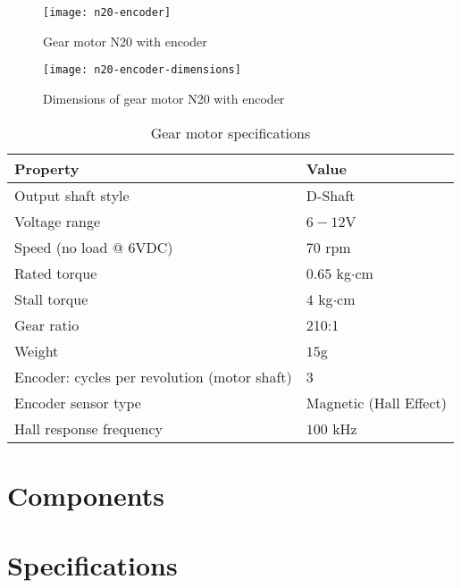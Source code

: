 \begin{figure}
    \centering
    \texttt{[image: n20-encoder]}
    \caption{Gear motor N20 with encoder}
    \label{fig:n20-encoder}
\end{figure}

\begin{figure}
    \centering
    \texttt{[image: n20-encoder-dimensions]}
    \caption{Dimensions of gear motor N20 with encoder}
    \label{fig:n20-encoder-dimensions}
\end{figure}


\begin{table}[]
    \centering
    \caption{Gear motor specifications}
    \label{tab:motor-specs}
    \begin{tabular}{@{}ll@{}}
    \toprule
    Property                                     & Value                  \\
    \midrule
    Output shaft style                           & D-Shaft                \\
    Voltage range                                & $6-12$V                \\
    Speed (no load @ 6VDC)                       & $70$ rpm               \\
    Rated torque                                 & $0.65$ kg$\cdot$cm            \\
    Stall torque                                 & $4$ kg$\cdot$cm               \\
    Gear ratio                                   & 210:1                  \\
    Weight                                       & $15$g                  \\
    Encoder: cycles per revolution (motor shaft) & 3                      \\
    Encoder sensor type                          & Magnetic (Hall Effect) \\
    Hall response frequency                      & $100$ kHz              \\
    \bottomrule
    \end{tabular}
\end{table}

\section{Components}

\blindtext

\blindtext

\section{Specifications}

\blindtext

\blindtext
